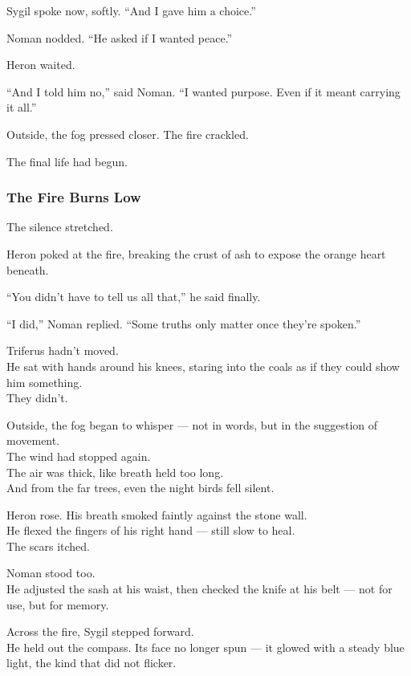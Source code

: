 \documentclass[12pt]{article}
\begin{document}
Sygil spoke now, softly. “And I gave him a choice.”

Noman nodded. “He asked if I wanted peace.”

Heron waited.

“And I told him no,” said Noman. “I wanted purpose. Even if it meant carrying it all.”

\vspace{1em}

Outside, the fog pressed closer. The fire crackled.

The final life had begun.

\dotfill

\subsubsection{The Fire Burns Low}

The silence stretched.

Heron poked at the fire, breaking the crust of ash to expose the orange heart beneath.

“You didn’t have to tell us all that,” he said finally.

“I did,” Noman replied. “Some truths only matter once they’re spoken.”

\vspace{1em}

Triferus hadn’t moved.\\
He sat with hands around his knees, staring into the coals as if they could show him something.\\
They didn’t.

Outside, the fog began to whisper — not in words, but in the suggestion of movement.\\
The wind had stopped again.\\
The air was thick, like breath held too long.\\
And from the far trees, even the night birds fell silent.

Heron rose. His breath smoked faintly against the stone wall.\\
He flexed the fingers of his right hand — still slow to heal.\\
The scars itched.

Noman stood too.\\
He adjusted the sash at his waist, then checked the knife at his belt — not for use, but for memory.

Across the fire, Sygil stepped forward.\\
He held out the compass. Its face no longer spun — it glowed with a steady blue light, the kind that did not flicker.
\end{document}
